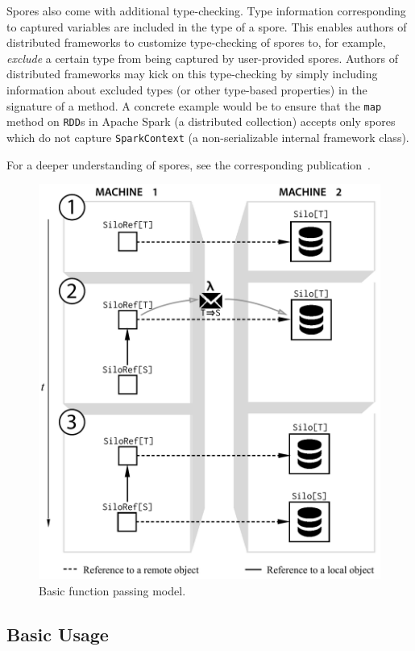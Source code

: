 \documentclass{jfp1}
\begin{document}
Spores also come with additional type-checking. Type information corresponding
to captured variables are included in the type of a spore. This enables authors
of distributed frameworks to customize type-checking of spores to, for example,
{\em exclude} a certain type from being captured by user-provided spores.
Authors of distributed frameworks may kick on this type-checking by simply
including information about excluded types (or other type-based properties) in
the signature of a method. A concrete example would be to ensure that the
\verb|map| method on \verb|RDD|s in Apache Spark (a distributed collection)
accepts only spores which do not capture \verb|SparkContext| (a non-serializable
internal framework class).

For a deeper understanding of spores, see
the corresponding publication~\cite{Spores}.

\begin{figure}[t!]
\centering\includegraphics[width=0.8\columnwidth]{pic/basic-diagram.pdf}
\caption{Basic function passing model.}\label{fig:basic-diagram}
\end{figure}

\subsection{Basic Usage}
\end{document}
